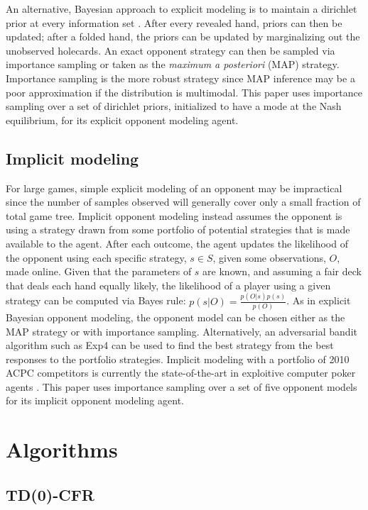 \documentclass{aamas2013}
\begin{document}
    An alternative, Bayesian approach to explicit modeling is to maintain a dirichlet prior at every information set \cite{bayesbluff,shortterm}. After every revealed hand, priors can then be updated; after a folded hand, the priors can be updated by marginalizing out the unobserved holecards. An exact opponent strategy can then be sampled via importance sampling or taken as the \textit{maximum a posteriori} (MAP) strategy. Importance sampling is the more robust strategy since MAP inference may be a poor approximation if the distribution is multimodal. This paper uses importance sampling over a set of dirichlet priors, initialized to have a mode at the Nash equilibrium, for its explicit opponent modeling agent.
    
    \subsection{Implicit modeling}
    For large games, simple explicit modeling of an opponent may be impractical since the number of samples observed will generally cover only a small fraction of total game tree. Implicit opponent modeling \cite{shortterm} instead assumes the opponent is using a strategy drawn from some portfolio of potential strategies that is made available to the agent. After each outcome, the agent updates the likelihood of the opponent using each specific strategy, $s \in S$, given some observations, $O$, made online. Given that the parameters of $s$ are known, and assuming a fair deck that deals each hand equally likely, the likelihood of a player using a given strategy can be computed via Bayes rule: $p(s | O) = \frac{p(O | s)p(s)}{p(O)}$. As in explicit Bayesian opponent modeling, the opponent model can be chosen either as the MAP strategy or with importance sampling. Alternatively, an adversarial bandit algorithm such as Exp4 \cite{exp4} can be used to find the best strategy from the best responses to the portfolio strategies. Implicit modeling with a portfolio of 2010 ACPC competitors is currently the state-of-the-art in exploitive computer poker agents \cite{implicit}. This paper uses importance sampling over a set of five opponent models for its implicit opponent modeling agent.

\section{Algorithms}

    \subsection{TD(0)-CFR}
\end{document}
